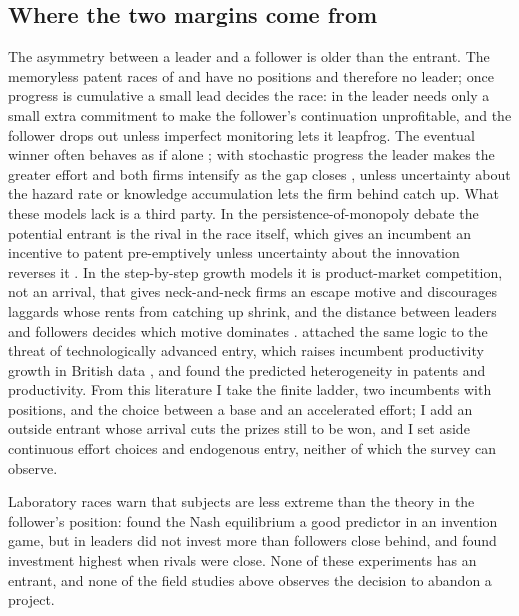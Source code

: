 \documentclass[preprint,12pt,authoryear]{elsarticle}
\begin{document}
\subsection{Where the two margins come from}

The asymmetry between a leader and a follower is older than the entrant. The memoryless patent races of \citet{loury1979market} and \citet{lee1980market} have no positions and therefore no leader; once progress is cumulative a small lead decides the race: in \citet{fudenberg1983preemption} the leader needs only a small extra commitment to make the follower's continuation unprofitable, and the follower drops out unless imperfect monitoring lets it leapfrog. The eventual winner often behaves as if alone \citep{harris1985perfect}; with stochastic progress the leader makes the greater effort and both firms intensify as the gap closes \citep{harris1987racing,grossman1987dynamic}, unless uncertainty about the hazard rate \citep{choi1991dynamic} or knowledge accumulation \citep{doraszelski2003rd} lets the firm behind catch up. What these models lack is a third party. In the persistence-of-monopoly debate the potential entrant is the rival in the race itself, which gives an incumbent an incentive to patent pre-emptively \citep{gilbert1982preemptive} unless uncertainty about the innovation reverses it \citep{reinganum1983uncertain}. In the step-by-step growth models \citep{aghion2001competition,aghion2005competition} it is product-market competition, not an arrival, that gives neck-and-neck firms an escape motive and discourages laggards whose rents from catching up shrink, and the distance between leaders and followers decides which motive dominates \citep{hashmi2013competition}. \citet{aghion2009entry} attached the same logic to the threat of technologically advanced entry, which raises incumbent productivity growth in British data \citep{aghion2004entry}, and found the predicted heterogeneity in patents and productivity. From this literature I take the finite ladder, two incumbents with positions, and the choice between a base and an accelerated effort; I add an outside entrant whose arrival cuts the prizes still to be won, and I set aside continuous effort choices and endogenous entry, neither of which the survey can observe.

Laboratory races warn that subjects are less extreme than the theory in the follower's position: \citet{isaac1988appropriability} found the Nash equilibrium a good predictor in an invention game, but in \citet{zizzo2002racing} leaders did not invest more than followers close behind, and \citet{breitmoser2010understanding} found investment highest when rivals were close. None of these experiments has an entrant, and none of the field studies above observes the decision to abandon a project.
\end{document}

